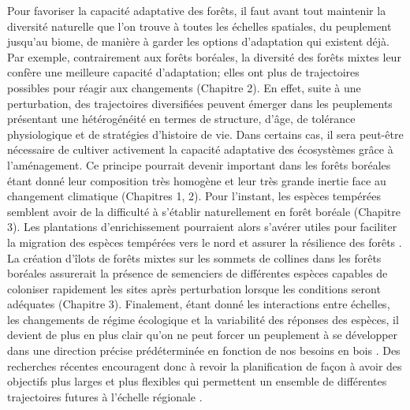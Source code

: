 Pour favoriser la capacité adaptative des forêts, il faut avant tout
maintenir la diversité naturelle que l'on trouve à toutes les échelles
spatiales, du peuplement jusqu'au biome, de manière à garder les options
d'adaptation qui existent déjà. Par exemple, contrairement aux forêts
boréales, la diversité des forêts mixtes leur confère une meilleure
capacité d'adaptation; elles ont plus de trajectoires possibles pour
réagir aux changements (Chapitre 2). En effet, suite à une perturbation,
des trajectoires diversifiées peuvent émerger dans les peuplements
présentant une hétérogénéité en termes de structure, d'âge, de tolérance
physiologique et de stratégies d'histoire de vie. Dans certains cas, il
sera peut-être nécessaire de cultiver activement la capacité adaptative
des écosystèmes grâce à l'aménagement. Ce principe pourrait devenir
important dans les forêts boréales étant donné leur composition très
homogène et leur très grande inertie face au changement climatique
(Chapitres 1, 2). Pour l'instant, les espèces tempérées semblent avoir
de la difficulté à s'établir naturellement en forêt boréale (Chapitre
3). Les plantations d'enrichissement pourraient alors s'avérer utiles
pour faciliter la migration des espèces tempérées vers le nord et
assurer la résilience des forêts \citep{duveneck_measuring_2016}. La
création d'îlots de forêts mixtes sur les sommets de collines dans les
forêts boréales assurerait la présence de semenciers de différentes
espèces capables de coloniser rapidement les sites après perturbation
lorsque les conditions seront adéquates (Chapitre 3). Finalement, étant
donné les interactions entre échelles, les changements de régime
écologique et la variabilité des réponses des espèces, il devient de
plus en plus clair qu'on ne peut forcer un peuplement à se développer
dans une direction précise prédéterminée en fonction de nos besoins en
bois \citep{puettmann_critique_2009}. Des recherches récentes
encouragent donc à revoir la planification de façon à avoir des
objectifs plus larges et plus flexibles qui permettent un ensemble de
différentes trajectoires futures à l'échelle régionale
\citep{messier_dealing_2016, puettmann_critique_2009}.


